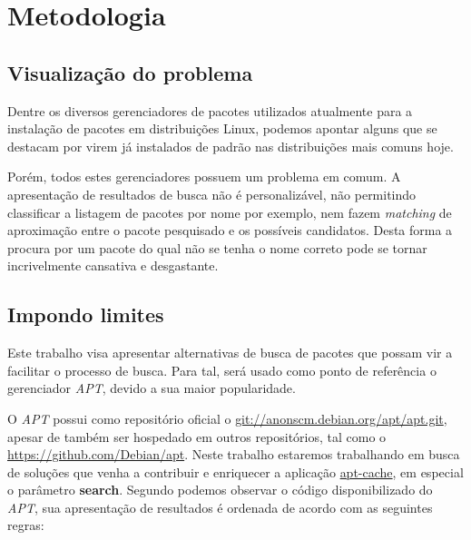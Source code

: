 \chapter{Metodologia} %
\label{cha:metodologia}


\section{Visualização do problema} %
\label{sub:visualiza_o_do_problema}

Dentre os diversos gerenciadores de pacotes utilizados atualmente para a instalação de pacotes em distribuições Linux, podemos apontar alguns que se destacam por virem já instalados de padrão nas distribuições mais comuns hoje.

Porém, todos estes gerenciadores possuem um problema em comum. A apresentação de resultados de busca não é personalizável, não permitindo classificar a listagem de pacotes por nome por exemplo, nem fazem \textit{matching} de aproximação  entre o pacote pesquisado e os possíveis candidatos. Desta forma a procura por um pacote do qual não se tenha o nome correto pode se tornar incrivelmente cansativa e desgastante.

\section{Impondo limites} %
\label{sub:impondo_limites}


Este trabalho visa apresentar alternativas de busca de pacotes que possam vir a facilitar  o processo de busca. Para tal, será usado como ponto de referência o gerenciador \textit{APT}, devido a sua maior popularidade.

O \textit{APT} possui como repositório oficial o \url{git://anonscm.debian.org/apt/apt.git}, apesar de também ser hospedado em outros repositórios, tal como o \url{https://github.com/Debian/apt}. Neste trabalho estaremos trabalhando em busca de soluções que venha a contribuir e enriquecer a aplicação \href{https://github.com/Debian/apt/blob/debian/experimental/cmdline/apt-cache.cc}{apt-cache}, em especial o parâmetro \textbf{search}. Segundo podemos observar o código disponibilizado do \textit{APT}, sua apresentação de resultados é ordenada de acordo com as seguintes regras:

